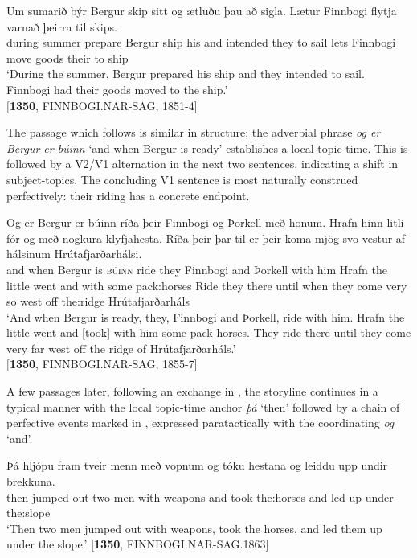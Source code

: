 \documentclass[output=paper,colorlinks,citecolor=brown]{langscibook}
\begin{document}
\ea
\gll Um sumarið býr Bergur skip sitt og ætluðu þau að sigla. Lætur Finnbogi flytja varnað þeirra til skips.\\
     during summer prepare Bergur ship his and intended they to sail  lets Finnbogi move goods their to ship \\
\glt `During the summer, Bergur prepared his ship and they intended to sail. Finnbogi had their goods moved to the ship.' \\
\hfill $[$\textbf{1350}, FINNBOGI.NAR-SAG, 1851-4]
\z

The passage which follows is similar in structure; the adverbial phrase \textit{og er Bergur er búinn} `and when Bergur is ready' establishes a local topic-time. This is followed by a V2/V1 alternation in the next two sentences, indicating a shift in subject-topics. The concluding V1 sentence is most naturally construed perfectively: their riding has a concrete endpoint.

\ea
\gll Og er Bergur er búinn ríða þeir Finnbogi og Þorkell með honum. Hrafn hinn litli fór og með nogkura klyfjahesta. Ríða þeir þar til er þeir koma mjög svo vestur af hálsinum Hrútafjarðarhálsi.\\
     and when Bergur is \textsc{búinn} ride they Finnbogi and Þorkell with him Hrafn the little went and with some pack:horses Ride they there until when they come very so west off the:ridge Hrútafjarðarháls\\
\glt `And when Bergur is ready, they, Finnbogi and Þorkell, ride with him. Hrafn the little went and [took] with him some pack horses. They ride there until they come very far west off the ridge of Hrútafjarðarháls.' \\
\hfill $[$\textbf{1350}, FINNBOGI.NAR-SAG, 1855-7]
\z

A few passages later, following an exchange in , the storyline continues in a typical manner with the local topic-time anchor \textit{þá} `then' followed by a chain of perfective events marked in , expressed paratactically with the coordinating  \textit{og} `and'.

\ea
\gll Þá hljópu fram tveir menn með vopnum og tóku hestana og leiddu upp undir brekkuna. \\
     then jumped out two men with weapons and took the:horses and led up under the:slope \\
\glt `Then two men jumped out with weapons, took the horses, and led them up under the slope.' \hfill  $[$\textbf{1350}, FINNBOGI.NAR-SAG.1863]
\z
\end{document}
